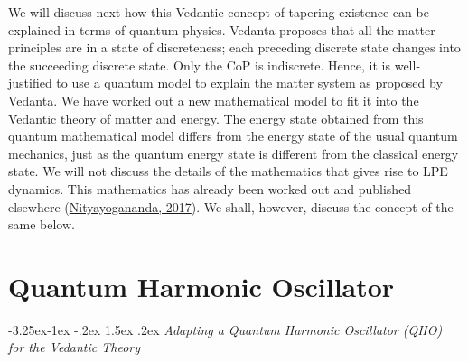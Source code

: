 \documentclass[twoside, 13pt]{article}
\makeatletter
\renewcommand\subsection{\@startsection{subsection}{2}{\z@}%
                                     {-3.25ex\@plus -1ex \@minus -.2ex}%
                                     {1.5ex \@plus .2ex}%
                                     {\normalfont\Large\bfseries}}
\makeatother
\begin{document}
{{\fontsize{12}{14}\selectfont We will discuss next how this Vedantic concept of tapering existence can be explained in terms of quantum physics. Vedanta proposes that all the matter principles are in a state of discreteness; each preceding discrete state changes into the succeeding discrete state. Only the CoP is indiscrete. Hence, it is well-justified to use a quantum model to explain the matter system as proposed by Vedanta. We have worked out a new mathematical model to fit it into the Vedantic theory of matter and energy. The energy state obtained from this quantum mathematical model differs from the energy state of the usual quantum mechanics, just as the quantum energy state is different from the classical energy state. We will not discuss the details of the mathematics that gives rise to LPE dynamics. This mathematics has already been worked out and published elsewhere (\underline{Nityayogananda, 2017}). We shall, however, discuss the concept of the same below.}

\vspace{.2cm}

{\fontsize{18}{20}\selectfont\section{Quantum Harmonic Oscillator}}\label{sec-3}

\vspace{-.3cm}

{\fontsize{8}{10}\selectfont\subsection{\textit{Adapting a Quantum Harmonic Oscillator (QHO)\\ for the Vedantic Theory}}}\label{subsec-3.1}


}
\end{document}
